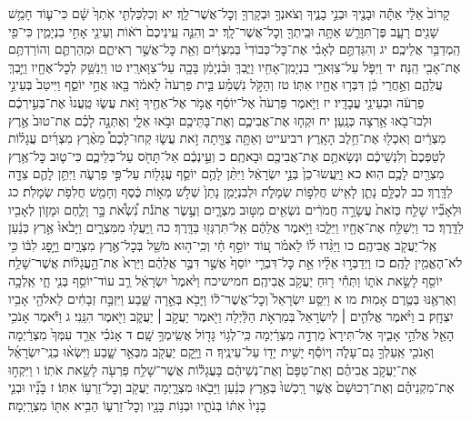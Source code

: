 \documentclass[twoside, openany, parskip=half, 11pt]{book}
\begin{document}
קָרוֹב֙ אֵלַ֔י אַתָּ֕ה וּבָנֶ֖יךָ וּבְנֵ֣י בָנֶ֑יךָ וְצֹאנְךָ֥ וּבְקָרְךָ֖ וְכׇל־אֲשֶׁר־לָֽךְ׃ יא וְכִלְכַּלְתִּ֤י אֹֽתְךָ֙ שָׁ֔ם כִּי־ע֛וֹד חָמֵ֥שׁ שָׁנִ֖ים רָעָ֑ב פֶּן־תִּוָּרֵ֛שׁ אַתָּ֥ה וּבֵֽיתְךָ֖ וְכׇל־אֲשֶׁר־לָֽךְ׃ יב וְהִנֵּ֤ה עֵֽינֵיכֶם֙ רֹא֔וֹת וְעֵינֵ֖י אָחִ֣י בִנְיָמִ֑ין כִּי־פִ֖י הַֽמְדַבֵּ֥ר אֲלֵיכֶֽם׃ יג וְהִגַּדְתֶּ֣ם לְאָבִ֗י אֶת־כׇּל־כְּבוֹדִי֙ בְּמִצְרַ֔יִם וְאֵ֖ת כׇּל־אֲשֶׁ֣ר רְאִיתֶ֑ם וּמִֽהַרְתֶּ֛ם וְהוֹרַדְתֶּ֥ם אֶת־אָבִ֖י הֵֽנָּה׃ יד וַיִּפֹּ֛ל עַל־צַוְּארֵ֥י בִנְיָמִֽן־אָחִ֖יו וַיֵּ֑בְךְּ וּבִ֨נְיָמִ֔ן בָּכָ֖ה עַל־צַוָּארָֽיו׃ טו וַיְנַשֵּׁ֥ק לְכׇל־אֶחָ֖יו וַיֵּ֣בְךְּ עֲלֵהֶ֑ם וְאַ֣חֲרֵי כֵ֔ן דִּבְּר֥וּ אֶחָ֖יו אִתּֽוֹ׃ טז וְהַקֹּ֣ל נִשְׁמַ֗ע בֵּ֤ית פַּרְעֹה֙ לֵאמֹ֔ר בָּ֖אוּ אֲחֵ֣י יוֹסֵ֑ף וַיִּיטַב֙ בְּעֵינֵ֣י פַרְעֹ֔ה וּבְעֵינֵ֖י עֲבָדָֽיו׃ יז וַיֹּ֤אמֶר פַּרְעֹה֙ אֶל־יוֹסֵ֔ף אֱמֹ֥ר אֶל־אַחֶ֖יךָ זֹ֣את עֲשׂ֑וּ טַֽעֲנוּ֙ אֶת־בְּעִ֣ירְכֶ֔ם וּלְכוּ־בֹ֖אוּ אַ֥רְצָה כְּנָֽעַן׃ יח וּקְח֧וּ אֶת־אֲבִיכֶ֛ם וְאֶת־בָּתֵּיכֶ֖ם וּבֹ֣אוּ אֵלָ֑י וְאֶתְּנָ֣ה לָכֶ֗ם אֶת־טוּב֙ אֶ֣רֶץ מִצְרַ֔יִם וְאִכְל֖וּ אֶת־חֵ֥לֶב הָאָֽרֶץ׃ רביעייט וְאַתָּ֥ה צֻוֵּ֖יתָה זֹ֣את עֲשׂ֑וּ קְחוּ־לָכֶם֩ מֵאֶ֨רֶץ מִצְרַ֜יִם עֲגָל֗וֹת לְטַפְּכֶם֙ וְלִנְשֵׁיכֶ֔ם וּנְשָׂאתֶ֥ם אֶת־אֲבִיכֶ֖ם וּבָאתֶֽם׃ כ וְעֵ֣ינְכֶ֔ם אַל־תָּחֹ֖ס עַל־כְּלֵיכֶ֑ם כִּי־ט֛וּב כׇּל־אֶ֥רֶץ מִצְרַ֖יִם לָכֶ֥ם הֽוּא׃ כא וַיַּֽעֲשׂוּ־כֵן֙ בְּנֵ֣י יִשְׂרָאֵ֔ל וַיִּתֵּ֨ן לָהֶ֥ם יוֹסֵ֛ף עֲגָל֖וֹת עַל־פִּ֣י פַרְעֹ֑ה וַיִּתֵּ֥ן לָהֶ֛ם צֵדָ֖ה לַדָּֽרֶךְ׃ כב לְכֻלָּ֥ם נָתַ֛ן לָאִ֖ישׁ חֲלִפ֣וֹת שְׂמָלֹ֑ת וּלְבִנְיָמִ֤ן נָתַן֙ שְׁלֹ֣שׁ מֵא֣וֹת כֶּ֔סֶף וְחָמֵ֖שׁ חֲלִפֹ֥ת שְׂמָלֹֽת׃ כג וּלְאָבִ֞יו שָׁלַ֤ח כְּזֹאת֙ עֲשָׂרָ֣ה חֲמֹרִ֔ים נֹשְׂאִ֖ים מִטּ֣וּב מִצְרָ֑יִם וְעֶ֣שֶׂר אֲתֹנֹ֡ת נֹֽ֠שְׂאֹ֠ת בָּ֣ר וָלֶ֧חֶם וּמָז֛וֹן לְאָבִ֖יו לַדָּֽרֶךְ׃ כד וַיְשַׁלַּ֥ח אֶת־אֶחָ֖יו וַיֵּלֵ֑כוּ וַיֹּ֣אמֶר אֲלֵהֶ֔ם אַֽל־תִּרְגְּז֖וּ בַּדָּֽרֶךְ׃ כה וַֽיַּעֲל֖וּ מִמִּצְרָ֑יִם וַיָּבֹ֙אוּ֙ אֶ֣רֶץ כְּנַ֔עַן אֶֽל־יַעֲקֹ֖ב אֲבִיהֶֽם׃ כו וַיַּגִּ֨דוּ ל֜וֹ לֵאמֹ֗ר ע֚וֹד יוֹסֵ֣ף חַ֔י וְכִֽי־ה֥וּא מֹשֵׁ֖ל בְּכׇל־אֶ֣רֶץ מִצְרָ֑יִם וַיָּ֣פׇג לִבּ֔וֹ כִּ֥י לֹא־הֶאֱמִ֖ין לָהֶֽם׃ כז וַיְדַבְּר֣וּ אֵלָ֗יו אֵ֣ת כׇּל־דִּבְרֵ֤י יוֹסֵף֙ אֲשֶׁ֣ר דִּבֶּ֣ר אֲלֵהֶ֔ם וַיַּרְא֙ אֶת־הָ֣עֲגָל֔וֹת אֲשֶׁר־שָׁלַ֥ח יוֹסֵ֖ף לָשֵׂ֣את אֹת֑וֹ וַתְּחִ֕י ר֖וּחַ יַעֲקֹ֥ב אֲבִיהֶֽם׃ חמישיכח וַיֹּ֙אמֶר֙ יִשְׂרָאֵ֔ל רַ֛ב עוֹד־יוֹסֵ֥ף בְּנִ֖י חָ֑י אֵֽלְכָ֥ה וְאֶרְאֶ֖נּוּ בְּטֶ֥רֶם אָמֽוּת׃ מו א וַיִּסַּ֤ע יִשְׂרָאֵל֙ וְכׇל־אֲשֶׁר־ל֔וֹ וַיָּבֹ֖א בְּאֵ֣רָה שָּׁ֑בַע וַיִּזְבַּ֣ח זְבָחִ֔ים לֵאלֹהֵ֖י אָבִ֥יו יִצְחָֽק׃ ב וַיֹּ֨אמֶר אֱלֹהִ֤ים ׀ לְיִשְׂרָאֵל֙ בְּמַרְאֹ֣ת הַלַּ֔יְלָה וַיֹּ֖אמֶר יַעֲקֹ֣ב ׀ יַעֲקֹ֑ב וַיֹּ֖אמֶר הִנֵּֽנִי׃ ג וַיֹּ֕אמֶר אָנֹכִ֥י הָאֵ֖ל אֱלֹהֵ֣י אָבִ֑יךָ אַל־תִּירָא֙ מֵרְדָ֣ה מִצְרַ֔יְמָה כִּֽי־לְג֥וֹי גָּד֖וֹל אֲשִֽׂימְךָ֥ שָֽׁם׃ ד אָנֹכִ֗י אֵרֵ֤ד עִמְּךָ֙ מִצְרַ֔יְמָה וְאָנֹכִ֖י אַֽעַלְךָ֣ גַם־עָלֹ֑ה וְיוֹסֵ֕ף יָשִׁ֥ית יָד֖וֹ עַל־עֵינֶֽיךָ׃ ה וַיָּ֥קׇם יַעֲקֹ֖ב מִבְּאֵ֣ר שָׁ֑בַע וַיִּשְׂא֨וּ בְנֵֽי־יִשְׂרָאֵ֜ל אֶת־יַעֲקֹ֣ב אֲבִיהֶ֗ם וְאֶת־טַפָּם֙ וְאֶת־נְשֵׁיהֶ֔ם בָּעֲגָל֕וֹת אֲשֶׁר־שָׁלַ֥ח פַּרְעֹ֖ה לָשֵׂ֥את אֹתֽוֹ׃ ו וַיִּקְח֣וּ אֶת־מִקְנֵיהֶ֗ם וְאֶת־רְכוּשָׁם֙ אֲשֶׁ֤ר רָֽכְשׁוּ֙ בְּאֶ֣רֶץ כְּנַ֔עַן וַיָּבֹ֖אוּ מִצְרָ֑יְמָה יַעֲקֹ֖ב וְכׇל־זַרְע֥וֹ אִתּֽוֹ׃ ז בָּנָ֞יו וּבְנֵ֤י בָנָיו֙ אִתּ֔וֹ בְּנֹתָ֛יו וּבְנ֥וֹת בָּנָ֖יו וְכׇל־זַרְע֑וֹ הֵבִ֥יא אִתּ֖וֹ מִצְרָֽיְמָה׃
\end{document}
